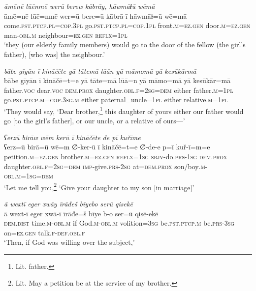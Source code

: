 \ea \label{RE.3}
\textit{āmēnē lūēnmē werū berew kābrāy, hāwmāɫū wēmā} \\ 
\gll āmē=nē lūē=nmē wer=ū bere=ū kābrā-ī hāwmāɫ=ū wē=mā \\ 
 come\textsc{.pst}\textsc{.ptcp}\textsc{.pl}\textsc{=cop}\textsc{.3pl} go\textsc{.pst}\textsc{.ptcp}\textsc{.pl}\textsc{=cop}\textsc{.\textsc{1pl}} front\textsc{.m}\textsc{\textsc{=ez.gen}} door\textsc{.m}\textsc{\textsc{=ez.gen}} man\textsc{-obl}\textsc{.m} neighbour\textsc{\textsc{=ez.gen}} \textsc{reflx}\textsc{=\textsc{1pl}} \\ 
\glt `they (our elderly family members) would go to the door of the fellow (the girl’s father), [who was] the neighbour.'
\z 
 
\ea \label{RE.4}
\textit{bābe gīyān ī kināčēte yā tātemā lūān yā māmomā yā kesūkārmā} \\ 
\gll bābe gīyān ī kināčē=t=e yā tāte=mā lūā=n yā māmo=mā yā kesūkār=mā \\ 
 father.\textsc{voc} dear.\textsc{voc} \textsc{dem.prox} daughter\textsc{.obl}\textsc{.f}\textsc{=\textsc{2sg}}\textsc{=dem} either father\textsc{.m}\textsc{=\textsc{1pl}} go\textsc{.pst}\textsc{.ptcp}\textsc{.m}\textsc{=cop}\textsc{.3sg}\textsc{.m} either paternal\_uncle\textsc{=\textsc{1pl}} either relative\textsc{.m}\textsc{=\textsc{1pl}} \\ 
\glt `They would say, ‘Dear brother,\footnote{Lit. father.} this daughter of yours \—either our father would go [to the girl’s father], or our uncle, or a relative of ours—'
\z 
 
\ea \label{RE.7}
\textit{ʕerzū birāw wēm kerū ī kināčēte de pī kuřīme} \\ 
\gll ʕerz=ū birā=ū wē=m ∅-ker-ū ī kināčē=t=e ∅-de-e p=ī kuř-ī=m=e \\ 
 petition\textsc{.m}\textsc{\textsc{=ez.gen}} brother\textsc{.m}\textsc{\textsc{=ez.gen}} \textsc{reflx}\textsc{=\textsc{1sg}} \textsc{sbjv-}do\textsc{.prs}\textsc{-\textsc{1sg}} \textsc{dem.prox} daughter\textsc{.obl}\textsc{.f}\textsc{=\textsc{2sg}}\textsc{=dem} \textsc{imp-}give\textsc{.prs}-\textsc{2sg} at=\textsc{dem.prox} son/boy\textsc{.m}\textsc{-obl}\textsc{.m}\textsc{=\textsc{1sg}}\textsc{=dem} \\ 
\glt `Let me tell you,\footnote{Lit. May a petition be at the service of my brother.} ‘Give your daughter to my son [in marriage]'
\z 
 
\ea \label{RE.8}
\textit{ā wextī eger xwāy īrāđeš bīyebo serū qisekē} \\ 
\gll ā wext-ī eger xwā-ī īrāđe=š bīye b-o ser=ū qisē-ekē \\ 
 \textsc{dem.dist} time\textsc{.m}\textsc{-obl}\textsc{.m} if God\textsc{.m}\textsc{-obl}\textsc{.m} volition\textsc{=3sg} be\textsc{.pst}\textsc{.ptcp}\textsc{.m} be\textsc{.prs}\textsc{-3sg} on\textsc{\textsc{=ez.gen}} talk\textsc{.f}\textsc{-def}\textsc{.obl}\textsc{.f} \\ 
\glt `Then, if God was willing over the subject,'
\z 
 
